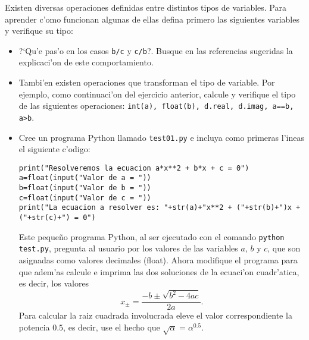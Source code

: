 \documentclass[11pt]{exam}
\begin{document}
\begin{questions}
\begin{parts}
\end{parts}
\item Existen diversas operaciones definidas entre distintos tipos de variables. Para aprender c'omo funcionan algunas de ellas defina primero las siguientes variables y verifique su tipo:
\begin{itemize}
\begin{verbatim}
a=3.14
b=2
c=5
d=6+2j
e="hola "
f="mechones"
g=True
\end{verbatim}
A continuaci'on calcule e imprima al valor y el tipo del resultado de las siguientes operaciones: \texttt{a+b, a+d, a+e, b+c, b+d, b+e, f+e, e+f, a*b, a*d, a*e, b*c, b*d, c*e, e*f, a**b, a**d, a**e, b**c, e**a, e**b, e**f, a/b, a/d, a/e, b/c, b/d, b/e, c/b, d/a, d/b, e/a, e/b, e/f,  a*g, b*g, not(g), g and False, g and True, g or False, g or True}. ?`Cu'ales operaciones no est'an definidas?
\item ?`Qu'e pas'o en los casos \texttt{b/c} y \texttt{c/b}?. Busque en las referencias sugeridas la explicaci'on de este comportamiento.
\item Tambi'en existen operaciones que transforman el tipo de variable. Por ejemplo, como continuaci'on del ejercicio anterior, calcule y verifique el tipo de las siguientes operaciones: \texttt{int(a), float(b), d.real, d.imag, a==b, a>b}.

\item Cree un programa Python llamado \texttt{test01.py} e incluya como primeras l'ineas el siguiente c'odigo:
\begin{verbatim}
print("Resolveremos la ecuacion a*x**2 + b*x + c = 0")
a=float(input("Valor de a = "))
b=float(input("Valor de b = "))
c=float(input("Valor de c = "))
print("La ecuacion a resolver es: "+str(a)+"x**2 + ("+str(b)+")x + ("+str(c)+") = 0")
\end{verbatim}
Este peque\~no programa Python, al ser ejecutado con el comando \texttt{python test.py}, pregunta al usuario por los valores de las variables $a$, $b$ y $c$, que son asignadas como valores decimales (float). Ahora modifique el programa para que adem'as calcule e imprima las dos soluciones de la ecuaci'on cuadr'atica, es decir, los valores 
\begin{equation}
x_\pm=\frac{-b\pm\sqrt{b^2-4ac}}{2a}.
\end{equation}
Para calcular la raiz cuadrada involucrada eleve el valor correspondiente la potencia $0.5$, es decir, use el hecho que $\sqrt{\alpha}=\alpha^{0.5}$.
\end{itemize}

\end{questions}
\end{document}
